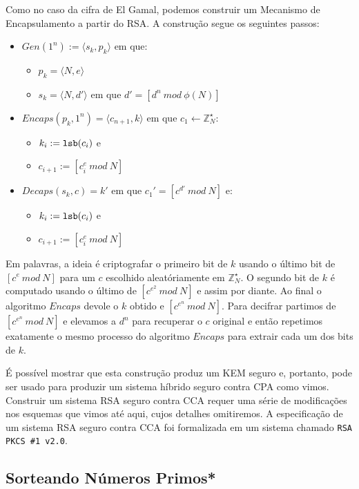Como no caso da cifra de El Gamal, podemos construir um Mecanismo de Encapsulamento a partir do RSA.
A construção segue os seguintes passos:
\begin{itemize}
\item $Gen(1^n) := \langle s_k, p_k \rangle$ em que:
\begin{itemize}
\item $p_k = \langle N, e \rangle$
\item $s_k = \langle N, d' \rangle$ em que $d' = [d^n\ mod\ \phi(N)]$
\end{itemize}
\item $Encaps(p_k, 1^n) = \langle c_{n+1}, k \rangle$ em que $c_1 \leftarrow \mathbb{Z}_N^\star$:
\begin{itemize}
\item $k_i := \textrm{\tt lsb}(c_i)$ e
\item $c_{i+1} := [c_i^e\ mod\ N]$
\end{itemize}
\item $Decaps(s_k, c) = k'$ em que $c_1' = [c^{d'}\ mod\ N]$ e:
\begin{itemize}
\item $k_i := \textrm{\tt lsb}(c_i)$ e
\item $c_{i+1} := [c_i^e\ mod\ N]$
\end{itemize}
\end{itemize}

Em palavras, a ideia é criptografar o primeiro bit de $k$ usando o último bit de $[c^e\ mod\ N]$ para um $c$ escolhido aleatóriamente em $\mathbb{Z}_N^\star$.
O segundo bit de $k$ é computado usando o último de $[c^{e^2}\ mod\ N]$ e assim por diante.
Ao final o algoritmo $Encaps$ devole o $k$ obtido e $[c^{e^n}\ mod\ N]$.
Para decifrar partimos de $[c^{e^n}\ mod\ N]$ e elevamos a $d^n$ para recuperar o $c$ original e então repetimos exatamente o mesmo processo do algoritmo $Encaps$ para extrair cada um dos bits de $k$.

É possível mostrar que esta construção produz um KEM seguro e, portanto, pode ser usado para produzir um sistema híbrido seguro contra CPA como vimos.
Construir um sistema RSA seguro contra CCA requer uma série de modificações nos esquemas que vimos até aqui, cujos detalhes omitiremos.
A especificação de um sistema RSA seguro contra CCA foi formalizada em um sistema chamado {\tt RSA PKCS \#1 v2.0}.


\subsection{Sorteando Números Primos*}
\label{sec:primos}

